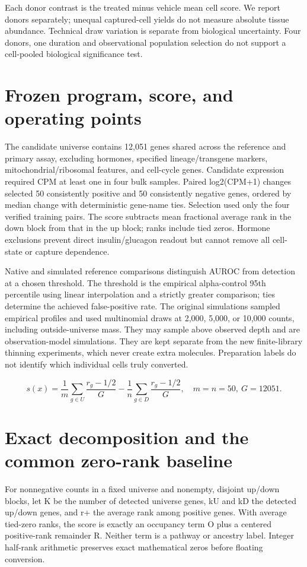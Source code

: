 \documentclass[11pt,letterpaper]{article}
\begin{document}
Each donor contrast is the treated minus vehicle mean cell score. We report donors separately; unequal captured-cell yields do not measure absolute tissue abundance. Technical draw variation is separate from biological uncertainty. Four donors, one duration and observational population selection do not support a cell-pooled biological significance test.

\section*{Frozen program, score, and operating points}
The candidate universe contains 12,051 genes shared across the reference and primary assay, excluding hormones, specified lineage/transgene markers, mitochondrial/ribosomal features, and cell-cycle genes. Candidate expression required CPM at least one in four bulk samples. Paired log2(CPM+1) changes selected 50 consistently positive and 50 consistently negative genes, ordered by median change with deterministic gene-name ties. Selection used only the four verified training pairs. The score subtracts mean fractional average rank in the down block from that in the up block; ranks include tied zeros. Hormone exclusions prevent direct insulin/glucagon readout but cannot remove all cell-state or capture dependence.

Native and simulated reference comparisons distinguish AUROC from detection at a chosen threshold. The threshold is the empirical alpha-control 95th percentile using linear interpolation and a strictly greater comparison; ties determine the achieved false-positive rate. The original simulations sampled empirical profiles and used multinomial draws at 2,000, 5,000, or 10,000 counts, including outside-universe mass. They may sample above observed depth and are observation-model simulations. They are kept separate from the new finite-library thinning experiments, which never create extra molecules. Preparation labels do not identify which individual cells truly converted.

\[s(x)=\frac{1}{m}\sum_{g\in U}\frac{r_g-1/2}{G}-\frac{1}{n}\sum_{g\in D}\frac{r_g-1/2}{G},\quad m=n=50,\ G=12051.\]
\section*{Exact decomposition and the common zero-rank baseline}
For nonnegative counts in a fixed universe and nonempty, disjoint up/down blocks, let K be the number of detected universe genes, kU and kD the detected up/down genes, and r+ the average rank among positive genes. With average tied-zero ranks, the score is exactly an occupancy term O plus a centered positive-rank remainder R. Neither term is a pathway or ancestry label. Integer half-rank arithmetic preserves exact mathematical zeros before floating conversion.
\end{document}
